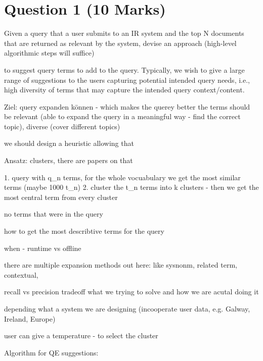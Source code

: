 \setcounter{page}{1}
\pagestyle{fancy}
\fancyhead[L]{\myassignment  \hspace*{1.5mm}- \mycourse} 
\fancyhead[R]{\mydate}


\section{Question 1 (10 Marks)}
Given a query that a user submits to an IR system and the top N documents
that are returned as relevant by the system, devise an approach (high-level
algorithmic steps will suffice)

to suggest query terms to add to the query. Typically, we wish to give a
large range of suggestions to the users capturing potential intended query
needs, i.e., high diversity of terms that may capture the intended query
context/content.


Ziel: query expanden können - which makes the querey better 
the terms should be relevant (able to expand the query in a meaningful way - find the correct topic), diverse (cover different topics)

we should design a heuristic allowing that

Ansatz: 
clusters, there are papers on that 



1. query with q\_n terms, for the whole vocuabulary we get the most similar terms (maybe 1000 t\_n)
2. cluster the t\_n terms into k clusters - then we get the most central term from every cluster

no terms that were in the query 

how to get the most describtive terms for the query 


when - runtime vs offline


there are multiple expansion methods out here: 
like sysnonm,  related term, contextual, 

recall vs precision tradeoff what we trying to solve and how we are acutal doing it

depending what a system we are designing (incooperate user data, e.g. Galway, Ireland, Europe)

user can give a temperature - to select the cluster


Algorithm for QE suggestions:


